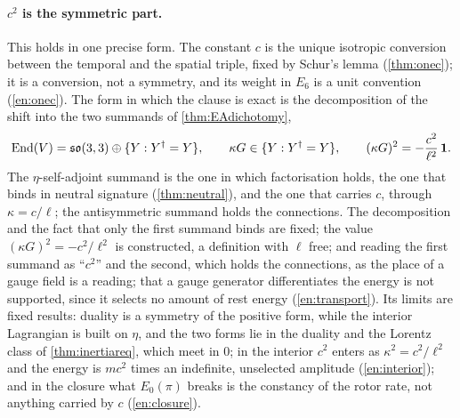 \paragraph{$c^2$ is the symmetric part.} This holds in one precise form. The constant $c$ is the unique isotropic conversion between the temporal and
the spatial triple, fixed by Schur's lemma (\cref{thm:onec}); it is a conversion, not a symmetry, and its weight in $E_6$ is a unit convention
(\cref{en:onec}). The form in which the clause is exact is the decomposition of the shift into the two summands of \cref{thm:EAdichotomy},
\[
\operatorname{End}(V)=\mathfrak{so}(3,3)\oplus\{Y:Y^\dagger=Y\},\qquad \kappa G\in\{Y:Y^\dagger=Y\},\qquad (\kappa G)^2=-\frac{c^2}{\ell^2}\,\mathbf 1 .
\]
The $\eta$-self-adjoint summand is the one in which factorisation holds, the one that binds in neutral signature (\cref{thm:neutral}), and the one
that carries $c$, through $\kappa=c/\ell$; the antisymmetric summand holds the connections. The decomposition and the fact that only the first summand
binds are fixed; the value $(\kappa G)^2=-c^2/\ell^2$ is constructed, a definition with $\ell$ free; and reading the first summand as ``$c^2$'' and the second, which holds the
connections, as the place of a gauge field is a reading; that a gauge generator differentiates the energy is not supported, since it selects no
amount of rest energy (\cref{en:transport}). Its limits are fixed results: duality is a symmetry of the positive form,
while the interior Lagrangian is built on $\eta$, and the two forms lie in the duality and the Lorentz class of \cref{thm:inertiareq}, which meet in $0$;
in the interior $c^2$ enters as $\kappa^2=c^2/\ell^2$ and the energy is $mc^2$ times an indefinite, unselected amplitude (\cref{en:interior}); and in the
closure what $E_0(\pi)$ breaks is the constancy of the rotor rate, not anything carried by $c$ (\cref{en:closure}).

